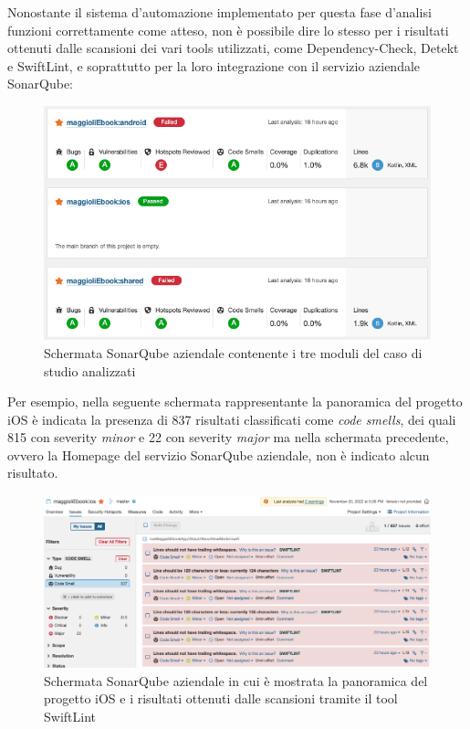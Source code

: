 Nonostante il sistema d'automazione implementato per questa fase d'analisi funzioni correttamente come atteso, 
non è possibile dire lo stesso per i risultati ottenuti dalle scansioni dei vari tools utilizzati, 
come Dependency-Check, 
Detekt e SwiftLint, 
e soprattutto per la loro integrazione con il servizio aziendale SonarQube:

\begin{figure}[H]
\centering
    \includegraphics[width=1\textwidth]{img/sonarqube-kmm.png}
    \caption{Schermata SonarQube aziendale contenente i tre moduli del caso di studio analizzati}
    \label{sonarqube-kmm}
\end{figure}

Per esempio, 
nella seguente schermata rappresentante la panoramica del progetto iOS è indicata la presenza di 837 risultati classificati come \textit{code smells},
dei quali 815 con severity \textit{minor} e 22 con severity \textit{major} ma nella schermata precedente, 
ovvero la Homepage del servizio SonarQube aziendale, 
non è indicato alcun risultato.

\begin{figure}[H]
\centering
    \includegraphics[width=1\textwidth]{img/sonarqube-ios.png}
    \caption{Schermata SonarQube aziendale in cui è mostrata la panoramica del progetto iOS e i risultati ottenuti dalle scansioni tramite il tool SwiftLint}
    \label{sonarqube-ios}
\end{figure}

